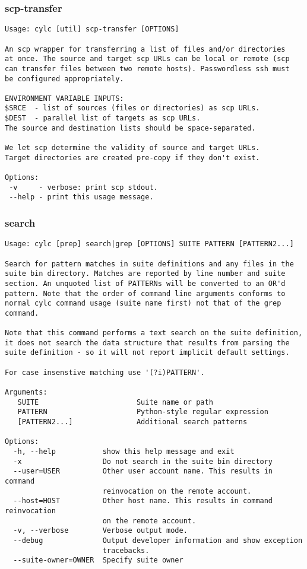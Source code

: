 \subsubsection{scp-transfer}
\label{scp-transfer}
\begin{lstlisting}
Usage: cylc [util] scp-transfer [OPTIONS]

An scp wrapper for transferring a list of files and/or directories
at once. The source and target scp URLs can be local or remote (scp
can transfer files between two remote hosts). Passwordless ssh must
be configured appropriately.

ENVIRONMENT VARIABLE INPUTS:
$SRCE  - list of sources (files or directories) as scp URLs.
$DEST  - parallel list of targets as scp URLs.
The source and destination lists should be space-separated.

We let scp determine the validity of source and target URLs.
Target directories are created pre-copy if they don't exist.

Options:
 -v     - verbose: print scp stdout.
 --help - print this usage message.
\end{lstlisting}
\subsubsection{search}
\label{search}
\begin{lstlisting}
Usage: cylc [prep] search|grep [OPTIONS] SUITE PATTERN [PATTERN2...] 

Search for pattern matches in suite definitions and any files in the
suite bin directory. Matches are reported by line number and suite
section. An unquoted list of PATTERNs will be converted to an OR'd
pattern. Note that the order of command line arguments conforms to
normal cylc command usage (suite name first) not that of the grep
command.

Note that this command performs a text search on the suite definition,
it does not search the data structure that results from parsing the
suite definition - so it will not report implicit default settings.

For case insenstive matching use '(?i)PATTERN'.

Arguments:
   SUITE                       Suite name or path
   PATTERN                     Python-style regular expression
   [PATTERN2...]               Additional search patterns

Options:
  -h, --help           show this help message and exit
  -x                   Do not search in the suite bin directory
  --user=USER          Other user account name. This results in command
                       reinvocation on the remote account.
  --host=HOST          Other host name. This results in command reinvocation
                       on the remote account.
  -v, --verbose        Verbose output mode.
  --debug              Output developer information and show exception
                       tracebacks.
  --suite-owner=OWNER  Specify suite owner
\end{lstlisting}
